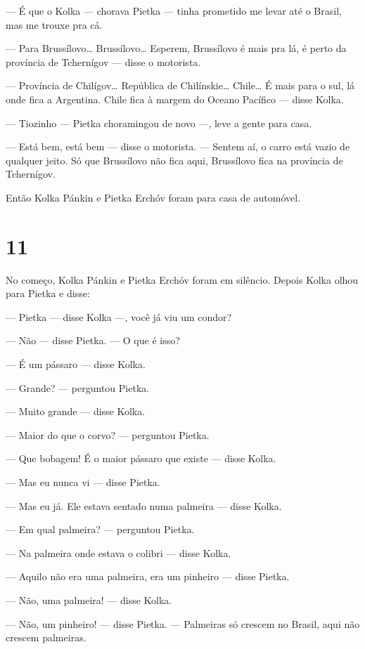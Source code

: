 --- É que o Kolka --- chorava Pietka --- tinha prometido me levar até o
Brasil, mas me trouxe pra cá.

--- Para Brussílovo\ldots{} Brussílovo\ldots{} Esperem, Brussílovo é mais pra lá,
é perto da província de Tchernígov --- disse o mo­torista.

--- Província de Chilígov\ldots{} República de Chilínskie\ldots{} Chile\ldots{} É mais
para o sul, lá onde fica a Argentina. Chile fica à margem do Oceano
Pacífico --- disse Kolka.

--- Tiozinho --- Pietka choramingou de novo ---, leve a gente para casa.

--- Está bem, está bem --- disse o motorista. --- Sentem aí, o car­ro
está vazio de qualquer jeito. Só que Brussílovo não fica aqui,
Brussílovo fica na província de Tchernígov.

Então Kolka Pánkin e Pietka Erchóv foram para casa de au­tomóvel.

\section{11}

No começo, Kolka Pánkin e Pietka Erchóv foram em silên­cio. Depois Kolka
olhou para Pietka e disse:

--- Pietka --- disse Kolka ---, você já viu um condor?

--- Não --- disse Pietka. --- O que é isso?

--- É um pássaro --- disse Kolka.

--- Grande? --- perguntou Pietka.

--- Muito grande --- disse Kolka.

--- Maior do que o corvo? --- perguntou Pietka.

--- Que bobagem! É o maior pássaro que existe --- disse Kolka.

--- Mas eu nunca vi --- disse Pietka.

--- Mas eu já. Ele estava sentado numa palmeira --- disse Kolka.

--- Em qual palmeira? --- perguntou Pietka.

--- Na palmeira onde estava o colibri --- disse Kolka.

--- Aquilo não era uma palmeira, era um pinheiro --- disse Pietka.

--- Não, uma palmeira! --- disse Kolka.

--- Não, um pinheiro! --- disse Pietka. --- Palmeiras só crescem no
Brasil, aqui não crescem palmeiras.


